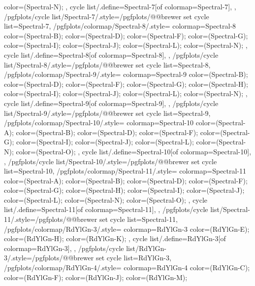 {{{      color=(Spectral-N);
    },
    cycle list/.define={Spectral-7}{[of colormap=Spectral-7]},
  },
  /pgfplots/cycle list/Spectral-7/.style={/pgfplots/@@brewer set cycle list={Spectral-7}},
  /pgfplots/colormap/Spectral-8/.style={
    colormap={Spectral-8}{
      color=(Spectral-B);
      color=(Spectral-D);
      color=(Spectral-F);
      color=(Spectral-G);
      color=(Spectral-I);
      color=(Spectral-J);
      color=(Spectral-L);
      color=(Spectral-N);
    },
    cycle list/.define={Spectral-8}{[of colormap=Spectral-8]},
  },
  /pgfplots/cycle list/Spectral-8/.style={/pgfplots/@@brewer set cycle list={Spectral-8}},
  /pgfplots/colormap/Spectral-9/.style={
    colormap={Spectral-9}{
      color=(Spectral-B);
      color=(Spectral-D);
      color=(Spectral-F);
      color=(Spectral-G);
      color=(Spectral-H);
      color=(Spectral-I);
      color=(Spectral-J);
      color=(Spectral-L);
      color=(Spectral-N);
    },
    cycle list/.define={Spectral-9}{[of colormap=Spectral-9]},
  },
  /pgfplots/cycle list/Spectral-9/.style={/pgfplots/@@brewer set cycle list={Spectral-9}},
  /pgfplots/colormap/Spectral-10/.style={
    colormap={Spectral-10}{
      color=(Spectral-A);
      color=(Spectral-B);
      color=(Spectral-D);
      color=(Spectral-F);
      color=(Spectral-G);
      color=(Spectral-I);
      color=(Spectral-J);
      color=(Spectral-L);
      color=(Spectral-N);
      color=(Spectral-O);
    },
    cycle list/.define={Spectral-10}{[of colormap=Spectral-10]},
  },
  /pgfplots/cycle list/Spectral-10/.style={/pgfplots/@@brewer set cycle list={Spectral-10}},
  /pgfplots/colormap/Spectral-11/.style={
    colormap={Spectral-11}{
      color=(Spectral-A);
      color=(Spectral-B);
      color=(Spectral-D);
      color=(Spectral-F);
      color=(Spectral-G);
      color=(Spectral-H);
      color=(Spectral-I);
      color=(Spectral-J);
      color=(Spectral-L);
      color=(Spectral-N);
      color=(Spectral-O);
    },
    cycle list/.define={Spectral-11}{[of colormap=Spectral-11]},
  },
  /pgfplots/cycle list/Spectral-11/.style={/pgfplots/@@brewer set cycle list={Spectral-11}},
  /pgfplots/colormap/RdYlGn-3/.style={
    colormap={RdYlGn-3}{
      color=(RdYlGn-E);
      color=(RdYlGn-H);
      color=(RdYlGn-K);
    },
    cycle list/.define={RdYlGn-3}{[of colormap=RdYlGn-3]},
  },
  /pgfplots/cycle list/RdYlGn-3/.style={/pgfplots/@@brewer set cycle list={RdYlGn-3}},
  /pgfplots/colormap/RdYlGn-4/.style={
    colormap={RdYlGn-4}{
      color=(RdYlGn-C);
      color=(RdYlGn-F);
      color=(RdYlGn-J);
      color=(RdYlGn-M);
}}}

